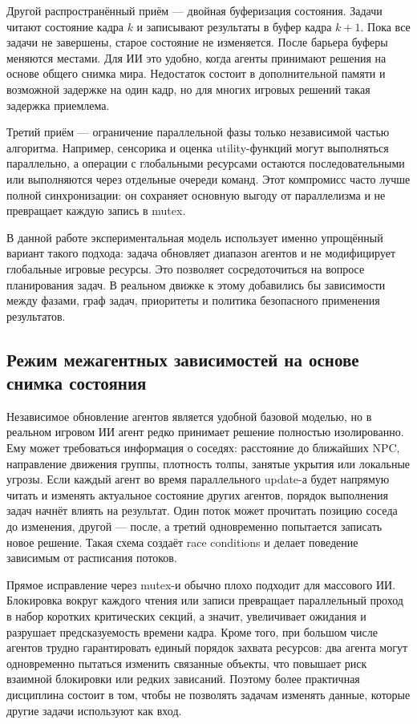 \documentclass[14pt,a4paper,oneside]{extreport}
\begin{document}
Другой распространённый приём --- двойная буферизация состояния. Задачи читают состояние кадра \(k\) и записывают результаты в буфер кадра \(k+1\). Пока все задачи не завершены, старое состояние не изменяется. После барьера буферы меняются местами. Для ИИ это удобно, когда агенты принимают решения на основе общего снимка мира. Недостаток состоит в дополнительной памяти и возможной задержке на один кадр, но для многих игровых решений такая задержка приемлема.

Третий приём --- ограничение параллельной фазы только независимой частью алгоритма. Например, сенсорика и оценка utility-функций могут выполняться параллельно, а операции с глобальными ресурсами остаются последовательными или выполняются через отдельные очереди команд. Этот компромисс часто лучше полной синхронизации: он сохраняет основную выгоду от параллелизма и не превращает каждую запись в mutex.

В данной работе экспериментальная модель использует именно упрощённый вариант такого подхода: задача обновляет диапазон агентов и не модифицирует глобальные игровые ресурсы. Это позволяет сосредоточиться на вопросе планирования задач. В реальном движке к этому добавились бы зависимости между фазами, граф задач, приоритеты и политика безопасного применения результатов.

\subsection{Режим межагентных зависимостей на основе снимка состояния}

Независимое обновление агентов является удобной базовой моделью, но в реальном игровом ИИ агент редко принимает решение полностью изолированно. Ему может требоваться информация о соседях: расстояние до ближайших NPC, направление движения группы, плотность толпы, занятые укрытия или локальные угрозы. Если каждый агент во время параллельного update-а будет напрямую читать и изменять актуальное состояние других агентов, порядок выполнения задач начнёт влиять на результат. Один поток может прочитать позицию соседа до изменения, другой --- после, а третий одновременно попытается записать новое решение. Такая схема создаёт race conditions и делает поведение зависимым от расписания потоков.

Прямое исправление через mutex-и обычно плохо подходит для массового ИИ. Блокировка вокруг каждого чтения или записи превращает параллельный проход в набор коротких критических секций, а значит, увеличивает ожидания и разрушает предсказуемость времени кадра. Кроме того, при большом числе агентов трудно гарантировать единый порядок захвата ресурсов: два агента могут одновременно пытаться изменить связанные объекты, что повышает риск взаимной блокировки или редких зависаний. Поэтому более практичная дисциплина состоит в том, чтобы не позволять задачам изменять данные, которые другие задачи используют как вход.
\end{document}
